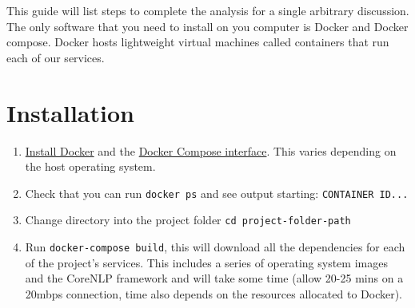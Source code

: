 This guide will list steps to complete the analysis for a single arbitrary discussion. The only software that you need to install on you computer is Docker and Docker compose. Docker hosts lightweight virtual machines called containers that run each of our services.

\section{Installation}
\begin{enumerate}
	\item{\href{https://docs.docker.com/engine/installation/}{Install Docker} and the \href{https://docs.docker.com/compose/install/}{Docker Compose interface}. This varies depending on the host operating system.}
	\item{Check that you can run \texttt{docker ps} and see output starting: \texttt{CONTAINER ID...}}
	\item{Change directory into the project folder \texttt{cd {project-folder-path}}}
	\item{Run \texttt{docker-compose build}, this will download all the dependencies for each of the project's services. This includes a series of operating system images and the CoreNLP framework and will take some time (allow 20-25 mins on a 20mbps connection, time also depends on the resources allocated to Docker).}
\end{enumerate}

